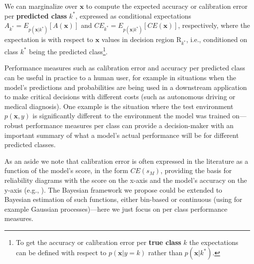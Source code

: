 \documentclass{article}
\newcommand{\ux}{{\mathbf{x}}}
\begin{document}
We can marginalize over $\ux$ to compute the expected accuracy or calibration error per {\bf predicted class} $k^*$, expressed as conditional expectations $A_{k^*}  = E_{p(\ux|k^*)}[A(\ux)]$ and $CE_{k^*} = E_{p(\ux|k^*)}[ CE(\ux)]$, respectively, where the expectation is with respect to $\ux$ values in decision region $\mbox{R}_{k^*}$, i.e., conditioned on class $k^* $ being the predicted class\footnote{To get the accuracy or calibration error per {\bf true class} $k$ the expectations can be defined with respect to $p(\ux | y = k)$  rather than $p(\ux|k^*)$.}.

Performance measures such as calibration error and accuracy per predicted class can be useful in practice to a human user, for example in situations  when the model's predictions and probabilities are being used in a downstream application to make critical decisions with different costs (such as autonomous driving or medical diagnosis).
One example is the situation where the test environment $p(\ux,y)$ is significantly different to the environment the model was trained on---robust performance measures per class can provide a decision-maker with an important summary of what a model's actual performance will be for different predicted classes. 

As an aside we note that calibration error is often expressed in the literature as a function of the model's score, in the form $CE(s_M)$, providing the basis for reliability diagrams with the score on the x-axis and the model's accuracy on the y-axis (e.g., \cite{guo2017calibration}).
The Bayesian framework we propose could be extended to Bayesian estimation of such functions, either bin-based or continuous (using for example Gaussian processes)---here we just focus on per class performance measures.
\end{document}
